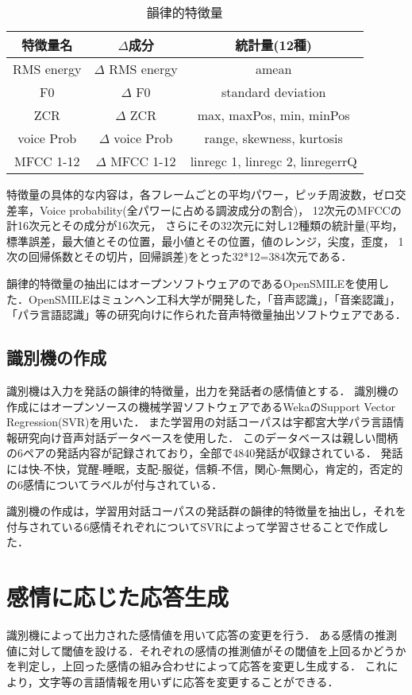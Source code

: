 \begin{table}[h]
\begin{center}
	\caption{韻律的特徴量}
	\begin{tabular}{c|c|c} \hline
		特徴量名 & $\Delta$成分 & 統計量(12種) \\ \hline \hline
		RMS energy & $\Delta$ RMS energy & amean \\ \cline{1-2}%
		F0 & $\Delta$ F0 \hline & standard deviation \\ \cline{1-2}%
		ZCR & $\Delta$ ZCR \hline & max, maxPos, min, minPos \\ \cline{1-2}
		voice Prob & $\Delta$ voice Prob \hline  & range, skewness, kurtosis \\ \cline{1-2}
		MFCC 1-12 & $\Delta$ MFCC 1-12 \hline & linregc 1, linregc 2, linregerrQ \\ \hline%
	\end{tabular}
	\label{tokutyou}
\end{center}
\end{table}

特徴量の具体的な内容は，各フレームごとの平均パワー，ピッチ周波数，ゼロ交差率，Voice probability(全パワーに占める調波成分の割合)，
12次元のMFCCの計16次元とその{\Delta}成分が16次元，
さらにその32次元に対し12種類の統計量(平均，標準誤差，最大値とその位置，最小値とその位置，値のレンジ，尖度，歪度，
1次の回帰係数とその切片，回帰誤差)をとった32*12=384次元である．

韻律的特徴量の抽出にはオープンソフトウェアのであるOpenSMILE\cite{opensmile}を使用した．OpenSMILEはミュンヘン工科大学が開発した，「音声認識」，「音楽認識」，「パラ言語認識」等の研究向けに作られた音声特徴量抽出ソフトウェアである．

%
%
\subsection{識別機の作成}
識別機は入力を発話の韻律的特徴量，出力を発話者の感情値とする．
識別機の作成にはオープンソースの機械学習ソフトウェアであるWeka\cite{weka}のSupport Vector Regression(SVR)を用いた．
また学習用の対話コーパスは宇都宮大学パラ言語情報研究向け音声対話データベース\cite{taiwa}を使用した．
このデータベースは親しい間柄の6ペアの発話内容が記録されており，全部で4840発話が収録されている．
発話には快-不快，覚醒-睡眠，支配-服従，信頼‐不信，関心‐無関心，肯定的，否定的の6感情についてラベルが付与されている．

識別機の作成は，学習用対話コーパスの発話群の韻律的特徴量を抽出し，それを付与されている6感情それぞれについてSVRによって学習させることで作成した．

\section{感情に応じた応答生成}
識別機によって出力された感情値を用いて応答の変更を行う．
ある感情の推測値に対して閾値を設ける．それぞれの感情の推測値がその閾値を上回るかどうかを判定し，上回った感情の組み合わせによって応答を変更し生成する．
これにより，文字等の言語情報を用いずに応答を変更することができる．



%
%
\newpage
%
%
%
%
%
%
%
%
%
%
% 